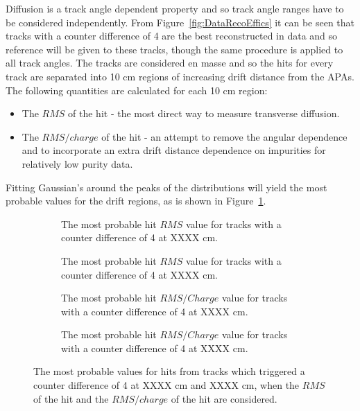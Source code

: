 Diffusion is a track angle dependent property and so track angle ranges have to be considered independently. From Figure~\ref{fig:DataRecoEffics} it can be seen that tracks with a counter difference of 4 are the best reconstructed in data and so reference will be given to these tracks, though the same procedure is applied to all track angles. The tracks are considered en masse and so the hits for every track are separated into 10 cm regions of increasing drift distance from the APAs. The following quantities are calculated for each 10 cm region:
\begin{itemize}
\item The $RMS$ of the hit - the most direct way to measure transverse diffusion.
\item The $RMS/charge$ of the hit - an attempt to remove the angular dependence and to incorporate an extra drift distance dependence on impurities for relatively low purity data.
\end{itemize}
Fitting Gaussian's around the peaks of the distributions will yield the most probable values for the drift regions, as is shown in Figure~\ref{fig:DiffDataHitFit}. \\

\begin{figure}[h!]
  \centering
  \begin{subfigure}{0.45\textwidth}
    \centering
    \caption{The most probable hit $RMS$ value for tracks with a counter difference of 4 at XXXX cm.}
  \end{subfigure}
  \hspace{0.08\textwidth}
  \begin{subfigure}{0.45\textwidth}
    \centering
    \caption{The most probable hit $RMS$ value for tracks with a counter difference of 4 at XXXX cm.}
  \end{subfigure}
  \begin{subfigure}{0.45\textwidth}
    \centering
    \caption{The most probable hit $RMS/Charge$ value for tracks with a counter difference of 4 at XXXX cm.}
  \end{subfigure}
  \hspace{0.08\textwidth}
  \begin{subfigure}{0.45\textwidth}
    \centering
    \caption{The most probable hit $RMS/Charge$ value for tracks with a counter difference of 4 at XXXX cm.}
  \end{subfigure}
  \caption[The most probable values of the $RMS$ and $RMS/Charge$ distributions for tracks with a counter difference of 4 in the 35 ton data]
          {The most probable values for hits from tracks which triggered a counter difference of 4 at XXXX cm and XXXX cm, when the $RMS$ of the hit and the $RMS/charge$ of the hit are considered.}
          \label{fig:DiffDataHitFit}
\end{figure}

